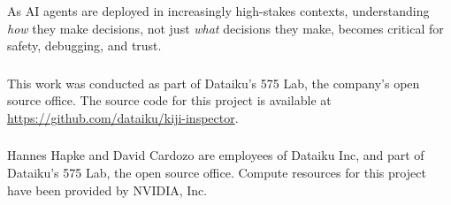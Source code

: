 \documentclass[runningheads]{llncs}
\begin{document}
As AI agents are deployed in increasingly high-stakes contexts, understanding \emph{how} they make decisions, not just \emph{what} decisions they make, becomes critical for safety, debugging, and trust.


\begin{credits}
\subsubsection{\ackname}
This work was conducted as part of Dataiku's 575 Lab, the company's open source office.
The source code for this project is available at \url{https://github.com/dataiku/kiji-inspector}.

\subsubsection{\discintname}
Hannes Hapke and David Cardozo are employees of Dataiku Inc, and part of Dataiku's 575 Lab, the open source office. Compute resources for this project have been provided by NVIDIA, Inc.
\end{credits}



\end{document}
